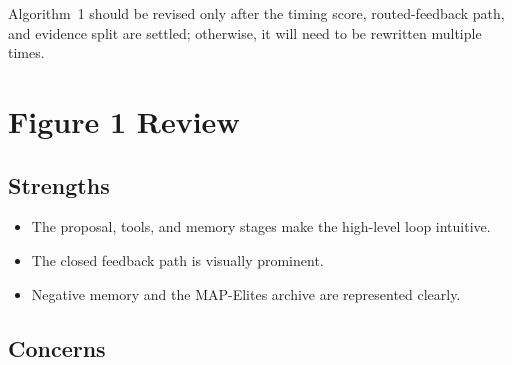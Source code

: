 \documentclass[11pt]{article}
\begin{document}
Algorithm~1 should be revised only after the timing score, routed-feedback
path, and evidence split are settled; otherwise, it will need to be rewritten
multiple times.

\section{Figure 1 Review}

\subsection{Strengths}

\begin{itemize}
  \item The proposal, tools, and memory stages make the high-level loop
  intuitive.
  \item The closed feedback path is visually prominent.
  \item Negative memory and the MAP-Elites archive are represented clearly.
\end{itemize}

\subsection{Concerns}
\end{document}

